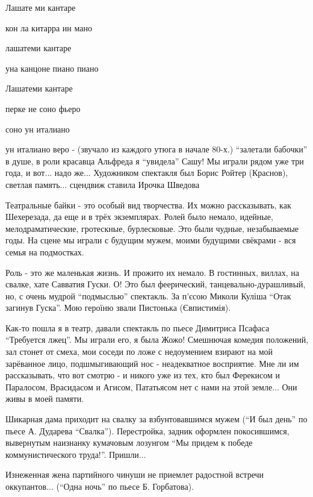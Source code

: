 Лашате ми кантаре

кон ла китарра ин мано

лашатеми кантаре

уна канцоне пиано пиано

Лашатеми кантаре

перке не соно фьеро

соно ун италиано

ун италиано веро - (звучало из каждого утюга в начале 80-х.) \enquote{залетали
бабочки} в душе, в роли красавца Альфреда я \enquote{увидела} Сашу! Мы играли
рядом уже три года, и вот... надо же... Художником спектакля был Борис Ройтер
(Краснов), светлая память... сцендвиж ставила Ирочка Шведова


Театральные байки - это особый вид творчества. Их можно рассказывать, как
Шехерезада, да еще и в трёх экземплярах. Ролей было немало, идейные,
мелодраматические, гротескные, бурлесковые. Это были чудные, незабываемые
годы. На сцене мы играли с будущим мужем, моими будущими свёкрами - вся семья
на подмостках.


Роль - это же маленькая жизнь. И прожито их немало. В гостинных, виллах, на
свалке, хате Савватия Гуски. О! Это был феерический, танцевально-дурашливый,
но, с очень мудрой \enquote{подмыслью} спектакль. За п'єсою Миколи Куліша \enquote{Отак загинув
Гуска}.   Мою героїню звали Пистонька (Євпистимія).

Как-то пошла я в театр, давали спектакль по пьесе Димитриса Псафаса
\enquote{Требуется лжец}. Мы играли его, я была Жожо! Смешнючая комедия
положений, зал стонет от смеха, мои соседи по ложе с недоумением взирают на мой
зарёванное лицо, подшмыгивающий нос - неадекватное восприятие. Мне ли им
рассказывать, что вот смотрю - и никого уже из тех, кто был Ферекисом и
Паралосом, Врасидасом и Агисом, Пататьясом нет с нами на этой земле... Они живы
в моей памяти.

Шикарная дама приходит на свалку за взбунтовавшимся мужем (\enquote{И был день} по
пьесе А. Дударева \enquote{Свалка}). Перестройка, задник оформлен покосившимся,
вывернутым наизнанку  кумачовым лозунгом \enquote{Мы придем к победе коммунистического
труда!}. Пришли...

Изнеженная жена партийного чинуши не приемлет радостной встречи оккупантов...
(\enquote{Одна ночь} по пьесе Б. Горбатова).

